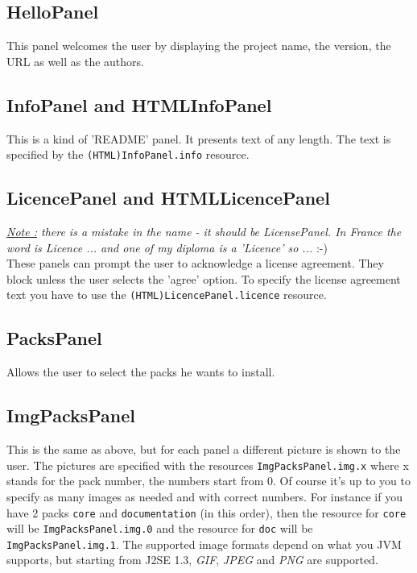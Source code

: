 \subsection{HelloPanel}

This panel welcomes the user by displaying the project name, the
version, the URL as well as the authors.\\

\subsection{InfoPanel and HTMLInfoPanel}

This is a kind of 'README' panel. It presents text of any length. The
text is specified by the \texttt{(HTML)InfoPanel.info} resource.\\

\subsection{LicencePanel and HTMLLicencePanel}

\noindent
\textit{\underline{Note :} there is a mistake in the name - it should be
LicensePanel. In France the word is Licence ... and one of my diploma is a
'Licence' so ...} :-)\\

These panels can prompt the user to acknowledge a license agreement. They block
unless the user selects the 'agree' option. To specify the license agreement
text you have to use the \texttt{(HTML)LicencePanel.licence} resource.\\

\subsection{PacksPanel}

Allows the user to select the packs he wants to install.\\

\subsection{ImgPacksPanel}

This is the same as above, but for each panel a different picture is
shown to the user. The pictures are specified with the resources
\texttt{ImgPacksPanel.img.x} where x stands for the pack number, the
numbers start from 0. Of course it's up to you to specify as many images
as needed and with correct numbers. For instance if you have 2 packs
\texttt{core} and \texttt{documentation} (in this order), then the resource for
\texttt{core} will be \texttt{ImgPacksPanel.img.0} and the resource for
\texttt{doc} will be \texttt{ImgPacksPanel.img.1}. The supported image formats
depend on what you JVM supports, but starting from J2SE 1.3, \textsl{GIF},
\textsl{JPEG} and \textsl{PNG} are supported.\\

